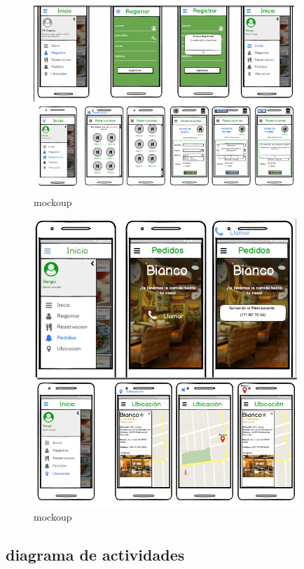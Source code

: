 \begin{figure}[H]
\caption{mockoup}
\centering
\includegraphics[width=10cm]{imagenes/mockup2}

\end{figure}

\begin{figure}[H]
\caption{mockoup}
\centering
\includegraphics[width=10cm]{imagenes/mockup3}

\end{figure}





\subsection{diagrama de actividades}



